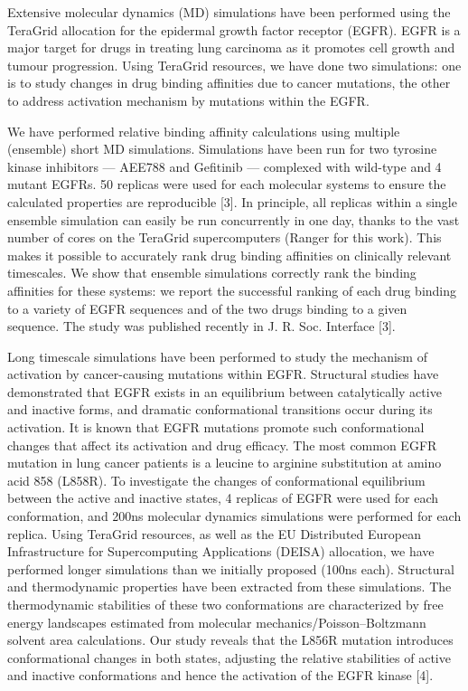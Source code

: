 \documentclass[a4paper,12pt]{article}
\begin{document}
Extensive molecular dynamics (MD) simulations have been performed using the TeraGrid allocation 
for the epidermal growth factor receptor (EGFR). EGFR is a major target for drugs in treating lung 
carcinoma as it promotes cell growth and tumour progression. Using TeraGrid resources, we have done 
two simulations: one is to study changes in drug binding affinities due to cancer mutations, the 
other to address activation mechanism by mutations within the EGFR.

We have performed relative binding affinity calculations using multiple (ensemble) short MD 
simulations. Simulations have been run for two tyrosine kinase inhibitors — AEE788 and Gefitinib — 
complexed with wild-type and 4 mutant EGFRs. 50 replicas were used for each molecular systems to 
ensure the calculated properties are reproducible [3]. In principle, all replicas within a single 
ensemble simulation can easily be run concurrently in one day, thanks to the vast number of cores 
on the TeraGrid supercomputers (Ranger for this work). This makes it possible to accurately rank 
drug binding affinities on clinically relevant timescales. We show that ensemble simulations 
correctly rank the binding affinities for these systems: we report the successful ranking of each 
drug binding to a variety of EGFR sequences and of the two drugs binding to a given sequence. The 
study was published recently in J. R. Soc. Interface [3].

Long timescale simulations have been performed to study the mechanism of activation by 
cancer-causing mutations within EGFR. Structural studies have demonstrated that EGFR exists in an 
equilibrium between catalytically active and inactive forms, and dramatic conformational 
transitions occur during its activation. It is known that EGFR mutations promote such conformational 
changes that affect its activation and drug efficacy. The most common EGFR mutation in lung cancer 
patients is a leucine to arginine substitution at amino acid 858 (L858R). To investigate the changes 
of conformational equilibrium between the active and inactive states, 4 replicas of EGFR were used 
for each conformation, and 200ns molecular dynamics simulations were performed for each replica. 
Using TeraGrid resources, as well as the EU Distributed European Infrastructure for Supercomputing 
Applications (DEISA) allocation, we have performed longer simulations than we initially proposed 
(100ns each). Structural and thermodynamic properties have been extracted from these simulations. 
The thermodynamic stabilities of these two conformations are characterized by free energy landscapes 
estimated from molecular mechanics/Poisson–Boltzmann solvent area calculations. Our study reveals 
that the L856R mutation introduces conformational changes in both states, adjusting the relative 
stabilities of active and inactive conformations and hence the activation of the EGFR kinase [4].
\end{document}

